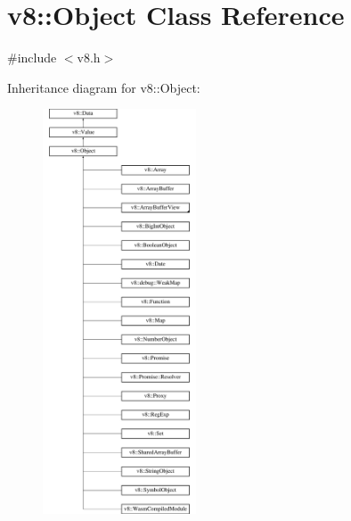 \hypertarget{classv8_1_1Object}{}\section{v8\+:\+:Object Class Reference}
\label{classv8_1_1Object}


{\ttfamily \#include $<$v8.\+h$>$}

Inheritance diagram for v8\+:\+:Object\+:\begin{figure}[H]
\begin{center}
\leavevmode
\includegraphics[height=12.000000cm]{classv8_1_1Object}
\end{center}
\end{figure}
